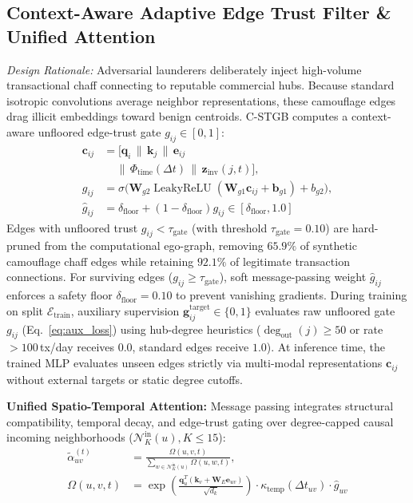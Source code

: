 \subsection{Context-Aware Adaptive Edge Trust Filter \& Unified Attention}
\label{sec:edge_trust_filter}
\textit{Design Rationale:} Adversarial launderers deliberately inject high-volume transactional chaff connecting to reputable commercial hubs. Because standard isotropic convolutions average neighbor representations, these camouflage edges drag illicit embeddings toward benign centroids. C-STGB computes a context-aware unfloored edge-trust gate $g_{ij} \in [0, 1]$:
\begin{align}
\mathbf{c}_{ij} &= [ \mathbf{q}_i \,\|\, \mathbf{k}_j \,\|\, \mathbf{e}_{ij} \nonumber \\
&\quad \,\|\, \Phi_{\text{time}}(\Delta t) \,\|\, \mathbf{z}_{\text{inv}}(j, t) ], \label{eq:edge_trust_gate} \\
g_{ij} &= \sigma\big( \mathbf{W}_{g2} \operatorname{LeakyReLU}( \mathbf{W}_{g1} \mathbf{c}_{ij} + \mathbf{b}_{g1} ) + b_{g2} \big), \label{eq:raw_edge_gate} \\
\hat{g}_{ij} &= \delta_{\text{floor}} + (1 - \delta_{\text{floor}}) g_{ij} \in [\delta_{\text{floor}}, 1.0]
\end{align}
Edges with unfloored trust $g_{ij} < \tau_{\text{gate}}$ (with threshold $\tau_{\text{gate}} = 0.10$) are hard-pruned from the computational ego-graph, removing $65.9\%$ of synthetic camouflage chaff edges while retaining $92.1\%$ of legitimate transaction connections. For surviving edges ($g_{ij} \ge \tau_{\text{gate}}$), soft message-passing weight $\hat{g}_{ij}$ enforces a safety floor $\delta_{\text{floor}} = 0.10$ to prevent vanishing gradients. During training on split $\mathcal{E}_{\text{train}}$, auxiliary supervision $\mathbf{g}_{ij}^{\text{target}} \in \{0, 1\}$ evaluates raw unfloored gate $g_{ij}$ (Eq.~\ref{eq:aux_loss}) using hub-degree heuristics ($\deg_{\text{out}}(j) \ge 50$ or rate $> 100$\,tx/day receives $0.0$, standard edges receive $1.0$). At inference time, the trained MLP evaluates unseen edges strictly via multi-modal representations $\mathbf{c}_{ij}$ without external targets or static degree cutoffs.

\textbf{Unified Spatio-Temporal Attention:} Message passing integrates structural compatibility, temporal decay, and edge-trust gating over degree-capped causal incoming neighborhoods ($\mathcal{N}_K^{\text{in}}(u), K \le 15$):
\begin{align}
\tilde{\alpha}_{uv}^{(t)} &= \frac{\Omega(u, v, t)}{\sum_{w \in \mathcal{N}_K^{\text{in}}(u)} \Omega(u, w, t)}, \\
\Omega(u, v, t) &= \exp\left(\tfrac{\mathbf{q}_u^T (\mathbf{k}_v + \mathbf{W}_E \mathbf{e}_{uv})}{\sqrt{d_k}}\right) \cdot \kappa_{\text{temp}}(\Delta t_{uv}) \cdot \hat{g}_{uv}
\end{align}

